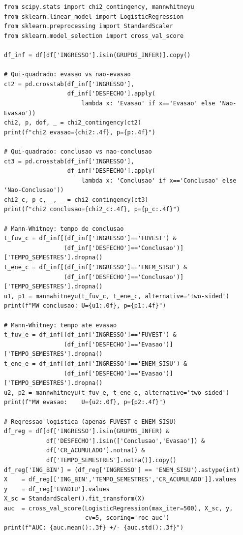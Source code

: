 \documentclass[12pt, a4paper]{article}
\begin{document}
\begin{lstlisting}[style=python, caption={Qui-quadrado, Mann-Whitney e regressão logística}]
from scipy.stats import chi2_contingency, mannwhitneyu
from sklearn.linear_model import LogisticRegression
from sklearn.preprocessing import StandardScaler
from sklearn.model_selection import cross_val_score

df_inf = df[df['INGRESSO'].isin(GRUPOS_INFER)].copy()

# Qui-quadrado: evasao vs nao-evasao
ct2 = pd.crosstab(df_inf['INGRESSO'],
                  df_inf['DESFECHO'].apply(
                      lambda x: 'Evasao' if x=='Evasao' else 'Nao-Evasao'))
chi2, p, dof, _ = chi2_contingency(ct2)
print(f"chi2 evasao={chi2:.4f}, p={p:.4f}")

# Qui-quadrado: conclusao vs nao-conclusao
ct3 = pd.crosstab(df_inf['INGRESSO'],
                  df_inf['DESFECHO'].apply(
                      lambda x: 'Conclusao' if x=='Conclusao' else 'Nao-Conclusao'))
chi2_c, p_c, _, _ = chi2_contingency(ct3)
print(f"chi2 conclusao={chi2_c:.4f}, p={p_c:.4f}")

# Mann-Whitney: tempo de conclusao
t_fuv_c = df_inf[(df_inf['INGRESSO']=='FUVEST') &
                 (df_inf['DESFECHO']=='Conclusao')]['TEMPO_SEMESTRES'].dropna()
t_ene_c = df_inf[(df_inf['INGRESSO']=='ENEM_SISU') &
                 (df_inf['DESFECHO']=='Conclusao')]['TEMPO_SEMESTRES'].dropna()
u1, p1 = mannwhitneyu(t_fuv_c, t_ene_c, alternative='two-sided')
print(f"MW conclusao: U={u1:.0f}, p={p1:.4f}")

# Mann-Whitney: tempo ate evasao
t_fuv_e = df_inf[(df_inf['INGRESSO']=='FUVEST') &
                 (df_inf['DESFECHO']=='Evasao')]['TEMPO_SEMESTRES'].dropna()
t_ene_e = df_inf[(df_inf['INGRESSO']=='ENEM_SISU') &
                 (df_inf['DESFECHO']=='Evasao')]['TEMPO_SEMESTRES'].dropna()
u2, p2 = mannwhitneyu(t_fuv_e, t_ene_e, alternative='two-sided')
print(f"MW evasao:    U={u2:.0f}, p={p2:.4f}")

# Regressao logistica (apenas FUVEST e ENEM_SISU)
df_reg = df[df['INGRESSO'].isin(GRUPOS_INFER) &
            df['DESFECHO'].isin(['Conclusao','Evasao']) &
            df['CR_ACUMULADO'].notna() &
            df['TEMPO_SEMESTRES'].notna()].copy()
df_reg['ING_BIN'] = (df_reg['INGRESSO'] == 'ENEM_SISU').astype(int)
X    = df_reg[['ING_BIN','TEMPO_SEMESTRES','CR_ACUMULADO']].values
y    = df_reg['EVADIU'].values
X_sc = StandardScaler().fit_transform(X)
auc  = cross_val_score(LogisticRegression(max_iter=500), X_sc, y,
                       cv=5, scoring='roc_auc')
print(f"AUC: {auc.mean():.3f} +/- {auc.std():.3f}")
\end{lstlisting}
\end{document}
